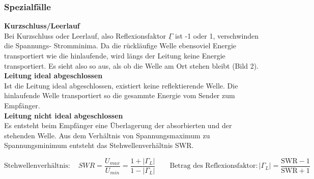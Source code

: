 	\subsubsection{Spezialfälle}
		\textbf{Kurzschluss/Leerlauf}\\
			Bei Kurzschluss oder Leerlauf, also Reflexionsfaktor $\underline{\Gamma}$ ist -1 oder 1, verschwinden die Spannungs- Stromminima.
			Da die rückläufige Welle ebensoviel Energie transportiert wie die hinlaufende, wird längs der Leitung keine Energie transportiert.
			Es sieht also so aus, als ob die Welle am Ort stehen bleibt (Bild 2).\\
		\textbf{Leitung ideal abgeschlossen}\\
			Ist die Leitung ideal abgeschlossen, existiert keine reflektierende Welle.
			Die hinlaufende Welle transportiert so die gesammte Energie vom Sender zum Empfänger.\\
		\textbf{Leitung nicht ideal abgeschlossen}\\
			Es entsteht beim Empfänger eine Überlagerung der absorbierten und der stehenden Welle.
			Aus dem Verhältnis von Spannungsmaximum zu Spannungsminimum entsteht das Stehwellenverhältnis SWR.
			
			$$\text{Stehwellenverhältnis}: \quad SWR=\frac{U_{max}}{U_{min}}=\frac{1+|\Gamma_L|}{1-|\Gamma_L|} \qquad \text{Betrag des Reflexionsfaktor}:|\Gamma_L|=\frac{\text{SWR} -1}{\text{SWR} +1}$$

